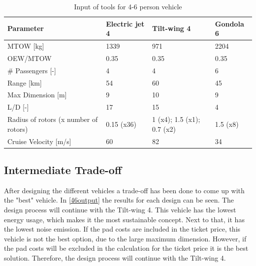 \begin{table}[H]
\captionsetup{justification=centering}
\caption{Input of tools for 4-6 person vehicle}
\label{46input}
\begin{tabular}{@{}llll@{}}
\toprule
\textbf{Parameter}                       & \textbf{Electric jet 4} & \textbf{Tilt-wing 4} & \textbf{Gondola 6} \\ \midrule
MTOW {[}kg{]}                            & 1339                   & 971                   & 2204                    \\
OEW/MTOW           & 0.35                   & 0.35                   & 0.35                    \\
\# Passengers {[}-{]}                    & 4                   &  4                  & 6                   \\
Range {[}km{]}                           & 54                   &  60                  & 45                    \\
Max Dimension {[}m{]}                    & 9                   & 10                    & 9                   \\
L/D {[}-{]}                              & 17                   & 15                   & 4                    \\
Radius of rotors (x number of rotors)      & 0.15 (x36)           & 1 (x4); 1.5 (x1); 0.7 (x2) & 1.5 (x8)                    \\
Cruise Velocity {[}m/s{]}                & 60                   & 82                    & 34                    \\ \bottomrule
\end{tabular}

\end{table}


\subsection{Intermediate Trade-off}
After designing the different vehicles a trade-off has been done to come up with the "best" vehicle. In \autoref{46output} the results for each design can be seen. The design process will continue with the Tilt-wing 4. This vehicle has the lowest energy usage, which makes it the most sustainable concept. Next to that, it has the lowest noise emission. If the pad costs are included in the ticket price, this vehicle is not the best option, due to the large maximum dimension. However, if the pad costs will be excluded in the calculation for the ticket price it is the best solution. Therefore, the design process will continue with the Tilt-wing 4.



